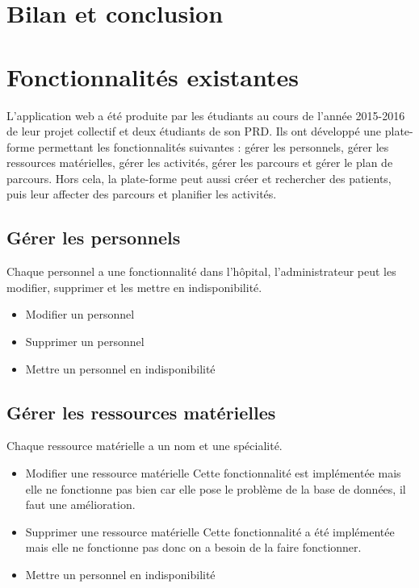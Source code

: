 \documentclass{polytech/polytech}
\begin{document}
\chapter{Bilan et conclusion}


\appendix

\chapter{Fonctionnalités existantes}
\label{ann:foncExist}

L'application web a été produite par les étudiants au cours de l'année 2015-2016 de leur projet collectif et deux étudiants de son PRD. Ils ont développé une plate-forme permettant les fonctionnalités suivantes : gérer les personnels, gérer les ressources matérielles, gérer les activités, gérer les parcours et gérer le plan de parcours. Hors cela, la plate-forme peut aussi créer et rechercher des patients, puis leur affecter des parcours et planifier les activités.


\section{Gérer les personnels}

Chaque personnel a une fonctionnalité dans l'hôpital, l'administrateur peut les modifier, supprimer et les mettre en indisponibilité.

\begin{itemize}
	\item Modifier un personnel
	\item Supprimer un personnel
	\item Mettre un personnel en indisponibilité
\end{itemize}

\section{Gérer les ressources matérielles}

Chaque ressource matérielle a un nom et une spécialité.

\begin{itemize}
	\item Modifier une ressource matérielle Cette fonctionnalité est implémentée mais elle ne fonctionne pas bien car elle pose le problème de la base de données, il faut une amélioration.
	\item Supprimer une ressource matérielle Cette fonctionnalité a été implémentée mais elle ne fonctionne pas donc on a besoin de la faire fonctionner.
	\item Mettre un personnel en indisponibilité
\end{itemize}
\end{document}
